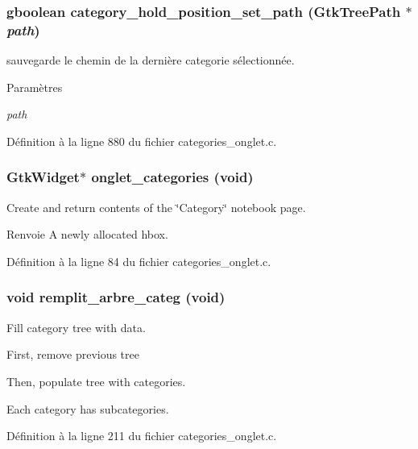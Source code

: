 \subsubsection[{category\_\-hold\_\-position\_\-set\_\-path}]{\setlength{\rightskip}{0pt plus 5cm}gboolean category\_\-hold\_\-position\_\-set\_\-path (GtkTreePath $\ast$ {\em path})}\label{categories__onglet_8h_a07189d15b8fbd91a38070efebee6ee97}
sauvegarde le chemin de la dernière categorie sélectionnée.


\begin{DoxyParams}{Paramètres}
\item[{\em path}]\end{DoxyParams}


Définition à la ligne 880 du fichier categories\_\-onglet.c.

\subsubsection[{onglet\_\-categories}]{\setlength{\rightskip}{0pt plus 5cm}GtkWidget$\ast$ onglet\_\-categories (void)}\label{categories__onglet_8h_a4aca926dc47f973c138ed72e9aad5804}
Create and return contents of the \char`\"{}Category\char`\"{} notebook page.

\begin{DoxyReturn}{Renvoie}
A newly allocated hbox. 
\end{DoxyReturn}


Définition à la ligne 84 du fichier categories\_\-onglet.c.

\subsubsection[{remplit\_\-arbre\_\-categ}]{\setlength{\rightskip}{0pt plus 5cm}void remplit\_\-arbre\_\-categ (void)}\label{categories__onglet_8h_a07984d808278a498b3fef3e187cc29e2}
Fill category tree with data. 

First, remove previous tree

Then, populate tree with categories.

Each category has subcategories. 



Définition à la ligne 211 du fichier categories\_\-onglet.c.

